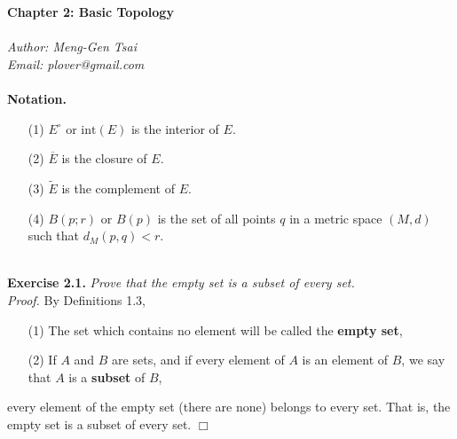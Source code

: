 \documentclass{article}
\begin{document}
\textbf{\Large Chapter 2: Basic Topology} \\\\



\emph{Author: Meng-Gen Tsai} \\
\emph{Email: plover@gmail.com} \\\\









\textbf{Notation.}
\begin{enumerate}
\item[(1)]
$E^{\circ}$ or $\text{int}(E)$ is the interior of $E$.
\item[(2)]
$\overline{E}$ is the closure of $E$.
\item[(3)]
$\widetilde{E}$ is the complement of $E$.
\item[(4)]
$B(p;r)$ or $B(p)$ is the set of all points $q$ in a metric space $(M,d)$
such that $d_M(p,q) < r$. \\\\
\end{enumerate}






\textbf{Exercise 2.1.}
\emph{Prove that the empty set is a subset of every set.} \\

\emph{Proof.}
By Definitions 1.3,
\begin{enumerate}
\item[(1)]
The set which contains no element will be called the \textbf{empty set},
\item[(2)]
If $A$ and $B$ are sets, and if every element of $A$ is an element of $B$,
we say that $A$ is a \textbf{subset} of $B$,
\end{enumerate}
every element of the empty set (there are none) belongs to every set.
That is, the empty set is a subset of every set.
$\Box$ \\\\
\end{document}
